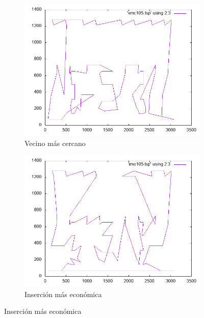 \documentclass[12pt,spanish]{article}
\begin{document}
\begin{figure}[H]
\centering
\begin{subfigure}[b]{0.36\textwidth}
\includegraphics[width=\textwidth]{lin105_vmc.png}
\caption{Vecino más cercano}
\end{subfigure}
\quad
\begin{subfigure}[b]{0.36\textwidth}
\includegraphics[width=\textwidth]{lin105_ime.png}
\caption{Inserción más económica}
\end{subfigure}

\vspace{1cm}


\end{figure}
\end{document}
